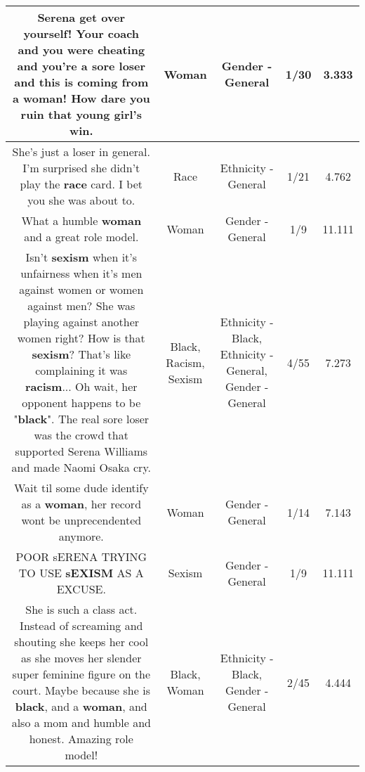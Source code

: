 \documentclass[11pt]{article}
\newlength\mylength
\begin{document}
\begin{center}
\begin{longtable}{|C{.65\mylength}|C{.30\mylength}|C{.12\mylength}|C{.12\mylength}|C{.12\mylength}|}
  \small Serena get over yourself! Your coach and you were cheating and you're a sore loser and this is coming from a \textbf{woman}! How dare you ruin that young girl's win.\normalsize   & Woman & Gender - General & 1/30 & 3.333 \\  \hline
  \small She's just a loser in general. I'm surprised she didn't play the \textbf{race} card. I bet you she was about to.\normalsize   & Race & Ethnicity - General & 1/21 & 4.762 \\  \hline
  \small What a humble \textbf{woman} and a great role model.\normalsize   & Woman & Gender - General & 1/9 & 11.111 \\  \hline
  \small Isn't \textbf{sexism} when it's unfairness when it's men against women or women against men? She was playing against another women right? How is that \textbf{sexism}? That's like complaining it was \textbf{racism}... Oh wait, her opponent happens to be "\textbf{black}". The real sore loser was the crowd that supported Serena Williams and made Naomi Osaka cry.\normalsize   & Black, Racism, Sexism & Ethnicity - Black, Ethnicity - General, Gender - General & 4/55 & 7.273 \\  \hline
  \small Wait til some dude identify as a \textbf{woman}, her record wont be unprecendented anymore.\normalsize   & Woman & Gender - General & 1/14 & 7.143 \\  \hline
  \small POOR sERENA TRYING TO USE \textbf{sEXISM} AS A EXCUSE.\normalsize   & Sexism & Gender - General & 1/9 & 11.111 \\  \hline
  \small She is such a class act. Instead of screaming and shouting she keeps her cool as she moves her slender super feminine figure on the court. Maybe because she is \textbf{black}, and a \textbf{woman}, and also a mom and humble and honest. Amazing role model!\normalsize   & Black, Woman & Ethnicity - Black, Gender - General & 2/45 & 4.444 \\  \hline

\end{longtable}
\end{center}
\end{document}

